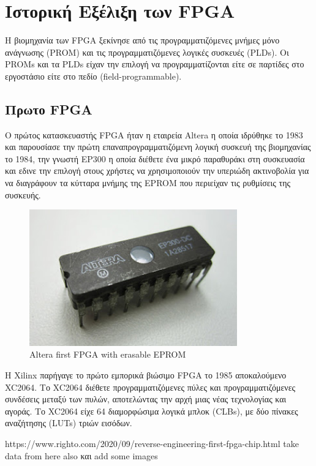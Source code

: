 \section{Ιστορική Εξέλιξη των FPGA}
Η βιομηχανία των FPGA ξεκίνησε από τις προγραμματιζόμενες μνήμες μόνο ανάγνωσης (PROM) και τις προγραμματιζόμενες λογικές συσκευές (PLDs). 
Οι PROMs και τα PLDs είχαν την επιλογή να προγραμματίζονται είτε σε παρτίδες στο εργοστάσιο είτε στο πεδίο (field-programmable).

\subsection{Πρωτο FPGA}
Ο πρώτος κατασκευαστής FPGA ήταν η εταιρεία Altera η οποία ιδρύθηκε το 1983 και παρουσίασε την πρώτη επαναπρογραμματιζόμενη λογική συσκευή της βιομηχανίας το 1984,
την γνωστή EP300 η οποία διέθετε ένα μικρό παραθυράκι στη συσκευασία και εδινε την επιλογή στους χρήστες να χρησιμοποιούν την υπεριώδη ακτινοβολία 
για να διαγράφουν τα κύτταρα μνήμης της EPROM που περιείχαν τις ρυθμίσεις της συσκευής.

\begin{figure}[h!]
  \centering
  \includegraphics[width=0.8\textwidth]{figures/chapter3/altera_first_fpga.png}
  \caption{Altera first FPGA with erasable EPROM}
  \label{fig:altera_first_fpga}
\end{figure}

Η Xilinx παρήγαγε το πρώτο εμπορικά βιώσιμο FPGA το 1985 αποκαλούμενο XC2064. 
Το XC2064 διέθετε προγραμματιζόμενες πύλες και προγραμματιζόμενες συνδέσεις μεταξύ των πυλών, αποτελώντας την αρχή μιας νέας τεχνολογίας και αγοράς.
Το XC2064 είχε 64 διαμορφώσιμα λογικά μπλοκ (CLBs), με δύο πίνακες αναζήτησης (LUTs) τριών εισόδων.

https://www.righto.com/2020/09/reverse-engineering-first-fpga-chip.html
take data from here also και add some images

